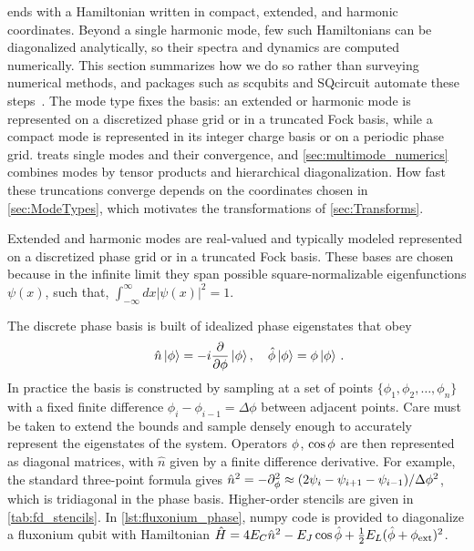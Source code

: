  ends with a Hamiltonian written in compact, extended, and harmonic coordinates.
Beyond a single harmonic mode, few such Hamiltonians can be diagonalized analytically, so their spectra and dynamics are computed numerically.
This section summarizes how we do so rather than surveying numerical methods, and packages such as scqubits and SQcircuit automate these steps~\cite{chittaComputeraidedQuantizationNumerical2022a,groszkowskiScqubitsPythonPackage2021a,rajabzadehAnalysisArbitrarySuperconducting2023,rajabzadehGeneralFrameworkGradientBased2024}.
The mode type fixes the basis: an extended or harmonic mode is represented on a discretized phase grid or in a truncated Fock basis, while a compact mode is represented in its integer charge basis or on a periodic phase grid.
 treats single modes and their convergence, and \cref{sec:multimode_numerics} combines modes by tensor products and hierarchical diagonalization.
How fast these truncations converge depends on the coordinates chosen in \cref{sec:ModeTypes}, which motivates the transformations of \cref{sec:Transforms}.

Extended and harmonic modes are real-valued and typically modeled represented on a discretized phase grid or in a truncated Fock basis.
These bases are chosen because in the infinite limit they span possible square-normalizable eigenfunctions $\psi(x)$, such that, $\int_{-\infty}^{\infty}dx|\psi(x)|^2 = 1$.

The discrete phase basis is built of idealized phase eigenstates that obey
\begin{align}
  \qquad \hat {n} \ket{\phi} = -i\frac{\partial}{\partial \phi}\ket{\phi}, \quad \hat {\phi}\ket{\phi} = \phi \ket{\phi} \,.
\end{align}
In practice the basis is constructed by sampling at a set of points $\{\phi_1,\phi_2, \dots, \phi_n\}$ with a fixed finite difference $\phi_i -\phi_{i-1} = \Delta\phi$ between adjacent points. Care must be taken to extend the bounds and sample densely enough to accurately represent the eigenstates of the system. Operators $\phi$, $\cos \phi$ are then represented as diagonal matrices, with $\hat n$ given by a finite difference derivative. For example, the standard three-point formula gives $\hat n^2 = -\partial_\phi^2 \approx (2\psi_i - \psi_{i+1} - \psi_{i-1})/\Delta\phi^2$, which is tridiagonal in the phase basis. Higher-order stencils are given in \cref{tab:fd_stencils}. In \cref{lst:fluxonium_phase}, numpy code is provided to diagonalize a fluxonium qubit with Hamiltonian $\hat H = 4E_C\hat{n}^2 - E_J\cos\hat{\phi} + \tfrac{1}{2}E_L(\hat{\phi}+\phi_{\rm ext})^2$.

